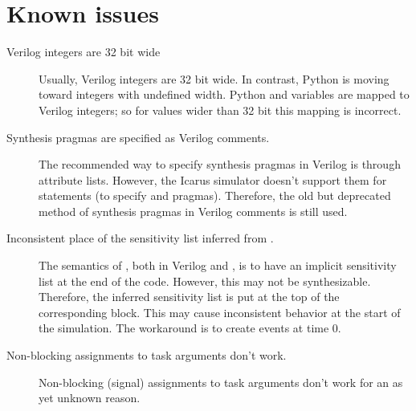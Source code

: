 \section{Known issues\label{conv-issues}}
\begin{description}
\item[Verilog integers are 32 bit wide]
Usually, Verilog integers are 32 bit wide. In contrast, Python is
moving toward integers with undefined width. Python  
and  variables are mapped to Verilog integers; so for values
wider than 32 bit this mapping is incorrect.

\item[Synthesis pragmas are specified as Verilog comments.] The recommended
way to specify synthesis pragmas in Verilog is through attribute
lists. However, the Icarus simulator doesn't support them
for  statements (to specify  and
 pragmas). Therefore, the old
but deprecated method of synthesis pragmas in Verilog comments
is still used.

\item[Inconsistent place of the sensitivity list inferred from .]
The semantics of , both in Verilog and \myhdl{}, is to
have an implicit sensitivity list at the end of the code. However, this
may not be synthesizable. Therefore, the inferred sensitivity list is
put at the top of the corresponding  block.
This may cause inconsistent behavior at the start of the
simulation. The workaround is to create events at time 0.

\item[Non-blocking assignments to task arguments don't work.] 
Non-blocking (signal) assignments to task arguments don't work
for an as yet unknown reason.
\end{description}
